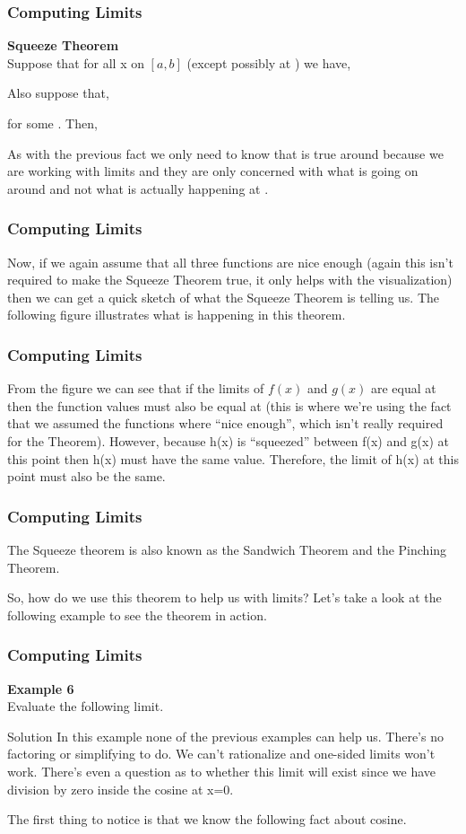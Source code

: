 \documentclass{beamer}
\begin{document}
\begin{frame}[fragile]
	\frametitle{Computing Limits}
	\Large
\textbf{Squeeze Theorem}\\
Suppose that for all x on $[a, b]$ (except possibly at  ) we have,

Also suppose that,

for some .  Then,


As with the previous fact we only need to know that  is true around  because we are working with limits and they are only concerned with what is going on around  and not what is actually happening at .
\end{frame}
\begin{frame}[fragile]
	\frametitle{Computing Limits}
	\Large
Now, if we again assume that all three functions are nice enough (again this isn’t required to make the Squeeze Theorem true, it only helps with the visualization) then we can get a quick sketch of what the Squeeze Theorem is telling us.  The following figure illustrates what is happening in this theorem.
\end{frame}
\begin{frame}[fragile]
	\frametitle{Computing Limits}
	\Large
From the figure we can see that if the limits of $f(x)$ and $g(x)$ are equal at  then the function values must also be equal at  (this is where we’re using the fact that we assumed the functions where “nice enough”, which isn’t really required for the Theorem).  However, because h(x) is “squeezed” between f(x) and g(x) at this point then h(x) must have the same value.  Therefore, the limit of h(x) at this point must also be the same.
\end{frame}
\begin{frame}[fragile]
	\frametitle{Computing Limits}
	\Large
The Squeeze theorem is also known as the Sandwich Theorem and the Pinching Theorem.

So, how do we use this theorem to help us with limits?  Let’s take a look at the following example to see the theorem in action.
\end{frame}
\begin{frame}[fragile]
	\frametitle{Computing Limits}
	\Large
\textbf{Example 6}\\  Evaluate the following limit.

Solution
In this example none of the previous examples can help us.  There’s no factoring or simplifying to do.  We can’t rationalize and one-sided limits won’t work.  There’s even a question as to whether this limit will exist since we have division by zero inside the cosine at x=0.

The first thing to notice is that we know the following fact about cosine.
\end{frame}
\end{document}
